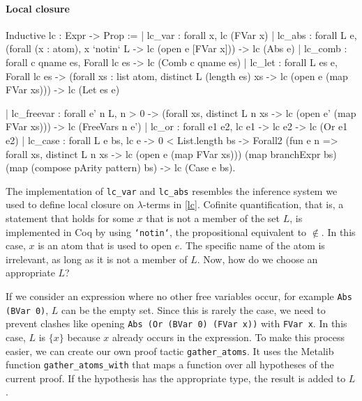 \documentclass[a4paper, 11pt, fleqn]{scrreprt}
\newcommand{\coqinline}[1]{\texttt{#1}}
\begin{document}
	\paragraph{Local closure}
	
	\begin{flushleft}
		\begin{minipage}[t]{.45 \linewidth}
			\begin{coqcode}
Inductive lc : Expr -> Prop :=
  | lc_var : forall x,
      lc (FVar x)
  | lc_abs : forall L e,
      (forall (x : atom),
        x `notin` L ->
        lc (open e [FVar x])) ->
      lc (Abs e)
  | lc_comb : forall c qname es,
      Forall lc es ->
      lc (Comb c qname es)
  | lc_let : forall L es e,
      Forall lc es ->
      (forall xs : list atom,
        distinct L (length es) xs ->
        lc (open e (map FVar xs))) ->
    lc (Let es e)
			\end{coqcode}
		\end{minipage}
		\hfill
		\vrule
		\vspace{.5 em}
		\begin{minipage}[t]{.5 \linewidth}
			\begin{coqcode}
 | lc_freevar : forall e' n L,
     n > 0 ->
     (forall xs, distinct L n xs ->
       lc (open e' (map FVar xs))) ->
       lc (FreeVars n e')
 | lc_or : forall e1 e2,
     lc e1 ->
     lc e2 ->
     lc (Or e1 e2)
 | lc_case : forall L e bs,
     lc e ->
     0 < List.length bs ->
     Forall2 
       (fun e n => forall xs,
          distinct L n xs ->
          lc (open e (map FVar xs)))
       (map branchExpr bs)
       (map (compose pArity pattern) bs) ->
     lc (Case e bs).

			\end{coqcode}
		\end{minipage}
	\end{flushleft}
	The implementation of \coqinline{lc_var} and \coqinline{lc_abs} resembles the inference system we used to define local closure on $\lambda$-terms in \autoref{lc}. Cofinite quantification, that is, a statement that holds for some $x$ that is not a member of the set $L$, is implemented in Coq by using \coqinline{`notin`}, the propositional equivalent to $\notin$. In this case, $x$ is an atom that is used to open $e$. The specific name of the atom is irrelevant, as long as it is not a member of $L$. Now, how do we choose an appropriate $L$? 
	\par \noindent
	If we consider an expression where no other free variables occur, for example \coqinline{Abs (BVar 0)}, $L$ can be the empty set. Since this is rarely the case, we need to prevent clashes like opening \coqinline{Abs (Or (BVar 0) (FVar x))} with \coqinline{FVar x}. In this case, $L$ is $\{x\}$ because $x$ already occurs in the expression. To make this process easier, we can create our own proof tactic \coqinline{gather_atoms}. It uses the Metalib function \coqinline{gather_atoms_with} that maps a function over all hypotheses of the current proof. If the hypothesis has the appropriate type, the result is added to $L$.
\end{document}
